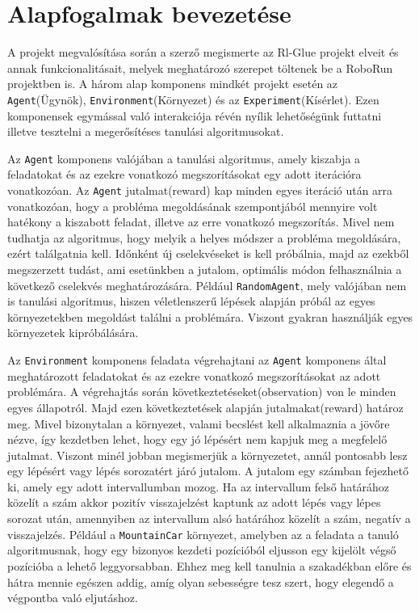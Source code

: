 \section{Alapfogalmak bevezetése}\label{sec:AlapfogalmakBevezetese}

A projekt megvalósítása során a szerző megismerte az  Rl-Glue projekt elveit és annak funkcionalitásait, melyek meghatározó szerepet töltenek be a RoboRun projektben is. A három alap komponens mindkét projekt esetén  az \texttt{Agent}(Ügynök), \texttt{Environment}(Környezet) és az \texttt{Experiment}(Kísérlet). Ezen komponensek egymással való interakciója révén nyílik lehetőségünk futtatni illetve tesztelni a megerősítéses tanulási algoritmusokat. 

	Az \texttt{Agent} komponens valójában a tanulási algoritmus, amely kiszabja a feladatokat és az ezekre vonatkozó megszorításokat egy adott iterációra vonatkozóan. Az \texttt{Agent} jutalmat(reward) kap minden egyes iteráció után arra vonatkozóan, hogy a probléma megoldásának szempontjából mennyire volt hatékony a kiszabott feladat, illetve az erre vonatkozó megszorítás. Mivel nem tudhatja az algoritmus, hogy melyik a helyes módszer a probléma megoldására, ezért találgatnia kell. Időnként új cselekvéseket is kell próbálnia, majd az ezekből megszerzett tudást, ami esetünkben a jutalom, optimális módon felhasználnia a következő cselekvés meghatározására. Például \texttt{RandomAgent}, mely valójában nem is tanulási algoritmus, hiszen véletlenszerű lépések alapján próbál az egyes környezetekben megoldást találni a problémára. Viszont gyakran használják egyes környezetek kipróbálására.
	
	Az \texttt{Environment} komponens feladata végrehajtani az \texttt{Agent} komponens által meghatározott feladatokat és az ezekre vonatkozó megszorításokat az adott problémára. A végrehajtás során következtetéseket(observation) von le minden egyes állapotról. Majd ezen következtetések alapján jutalmakat(reward) határoz meg. Mivel bizonytalan a környezet,    valami becslést kell alkalmaznia a jövőre nézve, így kezdetben lehet, hogy egy jó lépésért nem kapjuk meg a megfelelő jutalmat. Viszont minél jobban megismerjük a környezetet, annál pontosabb lesz egy lépésért vagy lépés sorozatért járó jutalom. A jutalom egy számban fejezhető ki, amely egy adott intervallumban mozog. Ha az intervallum felső határához közelít a szám akkor pozitív visszajelzést kaptunk az adott lépés vagy lépes sorozat után, amennyiben az intervallum alsó határához közelít a szám, negatív a visszajelzés. Például a \texttt{MountainCar} környezet, amelyben az a feladata a tanuló algoritmusnak, hogy egy bizonyos kezdeti pozícióból eljusson egy kijelölt végső pozícióba a lehető leggyorsabban. Ehhez meg kell tanulnia a szakadékban előre és hátra mennie egészen addig, amíg olyan sebességre tesz szert, hogy elegendő a végpontba való eljutáshoz.
	
